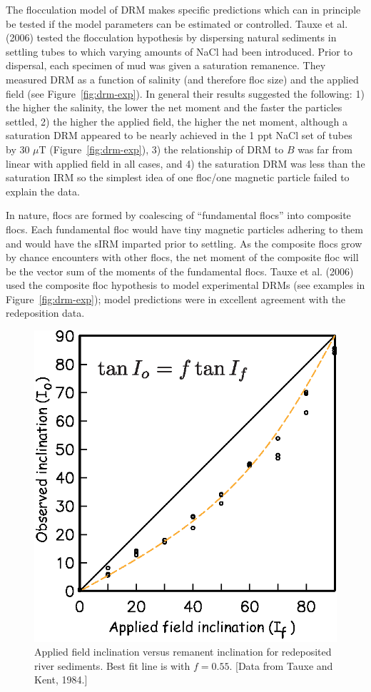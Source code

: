 The flocculation model of DRM  makes specific predictions which can in principle be tested if the model parameters can be estimated or controlled.  Tauxe et al. (2006)  tested the flocculation hypothesis by dispersing  natural sediments in settling tubes to which varying amounts of NaCl had been introduced.   Prior to dispersal, each specimen of mud was given a saturation remanence.  They measured DRM as a function of salinity (and therefore floc size) and the applied field (see Figure~\ref{fig:drm-exp}).    In general their results suggested the following:
1)  the higher the salinity,  the lower the net moment and the   faster the particles settled,  2) the higher the applied field, the  higher the net moment, although a saturation DRM appeared to be nearly achieved in the 1 ppt NaCl set of tubes by 30 $\mu$T (Figure~\ref{fig:drm-exp}),  3)  the relationship of DRM to $B$ was far from linear with applied field in all cases, and 4) the saturation DRM was less than the saturation IRM so the simplest idea of one floc/one magnetic particle failed to explain the data.  

 In nature, flocs are formed by coalescing of ``fundamental flocs'' into composite flocs.  Each fundamental floc would have tiny magnetic particles adhering to them and would have the sIRM imparted prior to settling.  As the composite flocs grow by chance encounters with other flocs, the net moment of the composite floc will be the vector sum of the moments of the fundamental flocs.  Tauxe et al. (2006) used the composite floc hypothesis to  model  experimental DRMs (see examples in Figure~\ref{fig:drm-exp}); model predictions were  in excellent agreement with the redeposition data.  


\begin{figure}[htb]
\centering  \includegraphics[width=7 cm]{EPSfiles/ifio.eps}
\caption{Applied field inclination versus remanent inclination for redeposited river sediments.  Best fit line is with $f=0.55$.   [Data from Tauxe and Kent, 1984.]   }
\label{fig:incerror}
\end{figure}
\nocite{tauxe84}



